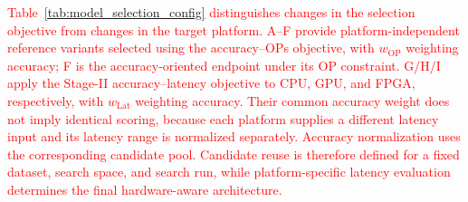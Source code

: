 \documentclass[preprint,review,12p,times]{elsarticle}
\begin{document}
\textcolor{red}{Table~\ref{tab:model_selection_config} distinguishes changes in the selection objective from changes in the target platform. A--F provide platform-independent reference variants selected using the accuracy--OPs objective, with $w_{\mathrm{OP}}$ weighting accuracy; F is the accuracy-oriented endpoint under its OP constraint. G/H/I apply the Stage-II accuracy--latency objective to CPU, GPU, and FPGA, respectively, with $w_{\mathrm{Lat}}$ weighting accuracy. Their common accuracy weight does not imply identical scoring, because each platform supplies a different latency input and its latency range is normalized separately. Accuracy normalization uses the corresponding candidate pool. Candidate reuse is therefore defined for a fixed dataset, search space, and search run, while platform-specific latency evaluation determines the final hardware-aware architecture.}
\end{document}

